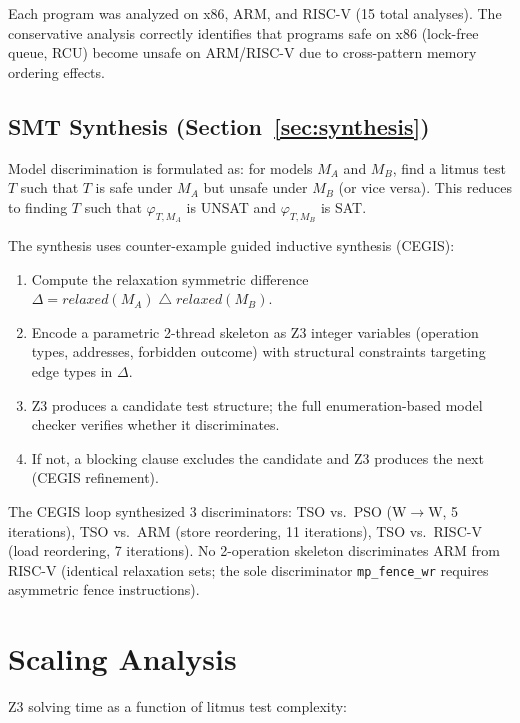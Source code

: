 \documentclass[11pt]{article}
\begin{document}
\noindent
Each program was analyzed on x86, ARM, and RISC-V (15 total analyses).
The conservative analysis correctly identifies that programs safe on
x86 (lock-free queue, RCU) become unsafe on ARM/RISC-V due to
cross-pattern memory ordering effects.

\subsection{SMT Synthesis (Section~\ref{sec:synthesis})}

Model discrimination is formulated as: for models $M_A$ and $M_B$,
find a litmus test $T$ such that $T$ is safe under $M_A$ but unsafe
under $M_B$ (or vice versa).  This reduces to finding $T$ such that
$\varphi_{T,M_A}$ is UNSAT and $\varphi_{T,M_B}$ is SAT.

The synthesis uses counter-example guided inductive synthesis (CEGIS):
\begin{enumerate}[nosep]
\item Compute the relaxation symmetric difference
  $\Delta = \mathit{relaxed}(M_A) \mathbin{\triangle} \mathit{relaxed}(M_B)$.
\item Encode a parametric 2-thread skeleton as Z3 integer variables
  (operation types, addresses, forbidden outcome) with structural
  constraints targeting edge types in $\Delta$.
\item Z3 produces a candidate test structure; the full enumeration-based
  model checker verifies whether it discriminates.
\item If not, a blocking clause excludes the candidate and Z3 produces
  the next (CEGIS refinement).
\end{enumerate}

\noindent
The CEGIS loop synthesized 3 discriminators: TSO vs.\ PSO (W$\to$W,
5 iterations), TSO vs.\ ARM (store reordering, 11 iterations),
TSO vs.\ RISC-V (load reordering, 7 iterations).
No 2-operation skeleton discriminates ARM from RISC-V (identical
relaxation sets; the sole discriminator \texttt{mp\_fence\_wr}
requires asymmetric fence instructions).

\section{Scaling Analysis}
\label{app:scaling}

Z3 solving time as a function of litmus test complexity:
\end{document}
